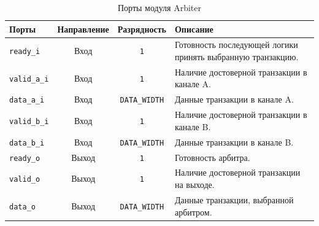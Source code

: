 \begin{table}[H]
	\centering
	\label{tab:round_robin_arbiter_ports}
	\small
	\begin{tabularx}{\textwidth}{l c c X}
		\toprule
		\textbf{Порты} & \textbf{Направление} & \textbf{Разрядность} & \textbf{Описание} \\
		\midrule
		
		\verb|ready_i| &
		Вход &
		\verb|1| &
		Готовность последующей логики принять выбранную транзакцию. \\
		
		\verb|valid_a_i| &
		Вход &
		\verb|1| &
		Наличие достоверной транзакции в канале A. \\
		
		\verb|data_a_i| &
		Вход &
		\verb|DATA_WIDTH| &
		Данные транзакции в канале A. \\
		
		\verb|valid_b_i| &
		Вход &
		\verb|1| &
		Наличие достоверной транзакции в канале B. \\
		
		\verb|data_b_i| &
		Вход &
		\verb|DATA_WIDTH| &
		Данные транзакции в канале B. \\
		
		\verb|ready_o| &
		Выход &
		\verb|1| &
		Готовность арбитра. \\
		
		\verb|valid_o| &
		Выход &
		\verb|1| &
		Наличие достоверной транзакции на выходе. \\
		
		\verb|data_o| &
		Выход &
		\verb|DATA_WIDTH| &
		Данные транзакции, выбранной арбитром. \\
		
		\bottomrule
	\end{tabularx}
	\caption{Порты модуля Arbiter}
\end{table}
